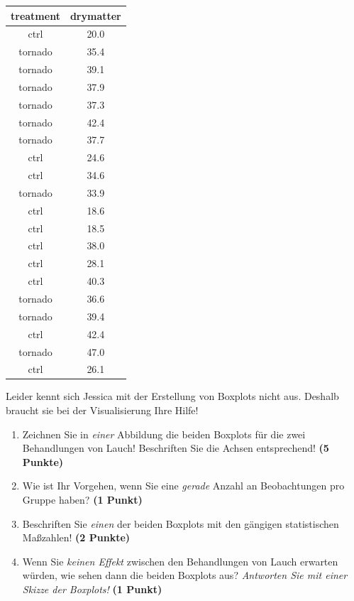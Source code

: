 \documentclass[a4paper, 9pt]{scrartcl}\usepackage[]{graphicx}\usepackage[]{xcolor}
\begin{document}
\begin{table}[!h]
\centering
\begin{tabular}{cc}
\toprule
treatment & drymatter\\
\midrule
ctrl & 20.0\\
tornado & 35.4\\
tornado & 39.1\\
tornado & 37.9\\
tornado & 37.3\\
\addlinespace
tornado & 42.4\\
tornado & 37.7\\
ctrl & 24.6\\
ctrl & 34.6\\
tornado & 33.9\\
\addlinespace
ctrl & 18.6\\
ctrl & 18.5\\
ctrl & 38.0\\
ctrl & 28.1\\
ctrl & 40.3\\
\addlinespace
tornado & 36.6\\
tornado & 39.4\\
ctrl & 42.4\\
tornado & 47.0\\
ctrl & 26.1\\
\bottomrule
\end{tabular}
\end{table}



Leider kennt sich Jessica mit der Erstellung von Boxplots nicht aus. Deshalb braucht sie bei der Visualisierung Ihre Hilfe!

\begin{enumerate}
\item Zeichnen Sie in \textit{einer} Abbildung die beiden Boxplots für die zwei Behandlungen von Lauch! Beschriften Sie die Achsen entsprechend! \textbf{(5 Punkte)} 
\item Wie ist Ihr Vorgehen, wenn Sie eine \textit{gerade} Anzahl an
  Beobachtungen pro Gruppe haben? \textbf{(1 Punkt)}
\item Beschriften Sie \textit{einen} der beiden Boxplots mit den gängigen
  statistischen Maßzahlen! \textbf{(2 Punkte)}
\item Wenn Sie \textit{keinen Effekt} zwischen den Behandlungen von
  Lauch erwarten würden, wie sehen dann die beiden Boxplots aus?
  \textit{Antworten Sie mit einer Skizze der Boxplots!}
  \textbf{(1 Punkt)}
\end{enumerate} 
\clearpage
\end{document}
